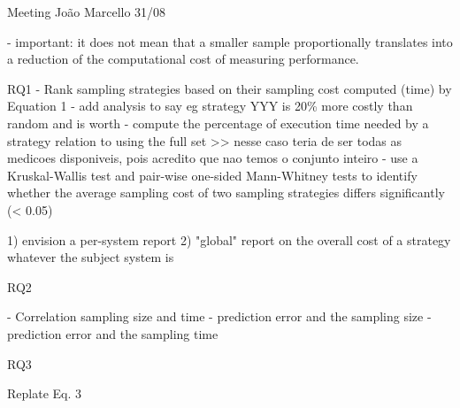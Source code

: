 Meeting João Marcello 31/08

- important: it does not mean that a smaller sample proportionally translates into a reduction of the computational cost of measuring performance.

RQ1
- Rank sampling strategies based on their sampling cost computed (time) by Equation 1
- add analysis to say eg strategy YYY is 20\% more costly than random and is worth
- compute the percentage of execution time needed by a strategy relation to using the full set >> nesse caso teria de ser todas as medicoes disponiveis, pois acredito que nao temos o conjunto inteiro
- use a Kruskal-Wallis test and pair-wise one-sided Mann-Whitney tests to identify whether the average sampling cost of two sampling strategies differs significantly (< 0.05)

1) envision a per-system report
2) "global" report on the overall cost of a strategy whatever the subject system is


RQ2

- Correlation sampling size and time
- prediction error and the sampling size
- prediction error and the sampling time

RQ3

Replate Eq. 3